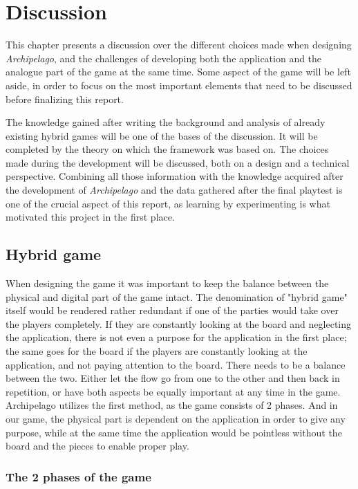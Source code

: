 \chapter{Discussion}
\label{sec:disc}
This chapter presents a discussion over the different choices made when designing \textit{Archipelago}, and the challenges of developing both the application and the analogue part of the game at the same time. Some aspect of the game will be left aside, in order to focus on the most important elements that need to be discussed before finalizing this report.

The knowledge gained after writing the background and analysis of already existing hybrid games will be one of the bases of the discussion. It will be completed by the theory on which the framework was based on. The choices made during the development will be discussed, both on a design and a technical perspective. Combining all those information with the knowledge acquired after the development of \textit{Archipelago} and the data gathered after the final playtest is one of the crucial aspect of this report, as learning by experimenting is what motivated this project in the first place. 

\section{Hybrid game}
When designing the game it was important to keep the balance between the physical and digital part of the game intact. 
The denomination of "hybrid game" itself would be rendered rather redundant if one of the parties would take over the players completely. If they are constantly looking at the board and neglecting the application, there is not even a purpose for the application in the first place; the same goes for the board if the players are constantly looking at the application, and not paying attention to the board. 
There needs to be a balance between the two. Either let the flow go from one to the other and then back in repetition, or have both aspects be equally important at any time in the game. 
Archipelago utilizes the first method, as the game consists of 2 phases. And in our game, the physical part is dependent on the application in order to give any purpose, while at the same time the application would be pointless without the board and the pieces to enable proper play.

\subsection{The 2 phases of the game}

